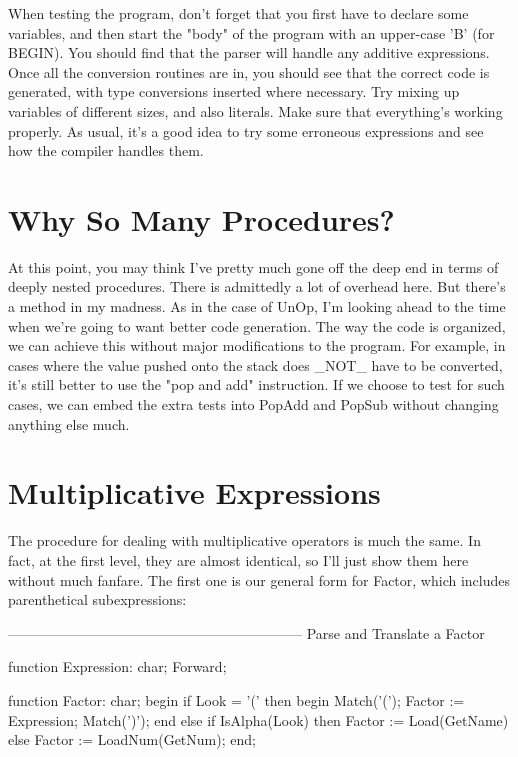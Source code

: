 \documentclass[float=false, crop=false]{standalone}
\begin{document}
When testing the program, don't forget that you first have to declare some
variables, and then start the "body" of the program with an upper-case 'B' (for
BEGIN). You should find that the parser will handle any additive expressions.
Once all the conversion routines are in, you should see that the correct code is
generated, with type conversions inserted where necessary. Try mixing up
variables of different sizes, and also literals. Make sure that everything's
working properly. As usual, it's a good idea to try some erroneous expressions
and see how the compiler handles them.


\section{Why So Many Procedures?}

At this point, you may think I've pretty much gone off the deep end in terms of
deeply nested procedures. There is admittedly a lot of overhead here. But
there's a method in my madness. As in the case of UnOp, I'm looking ahead to the
time when we're going to want better code generation. The way the code is
organized, we can achieve this without major modifications to the program. For
example, in cases where the value pushed onto the stack does _NOT_ have to be
converted, it's still better to use the "pop and add" instruction. If we choose
to test for such cases, we can embed the extra tests into PopAdd and PopSub
without changing anything else much.


\section{Multiplicative Expressions}

The procedure for dealing with multiplicative operators is much the same. In
fact, at the first level, they are almost identical, so I'll just show them here
without much fanfare. The first one is our general form for Factor, which
includes parenthetical subexpressions:


{---------------------------------------------------------------}
{ Parse and Translate a Factor }

function Expression: char; Forward;

function Factor: char;
begin
   if Look = '(' then begin
      Match('(');
      Factor := Expression;
      Match(')');
      end
   else if IsAlpha(Look) then
      Factor := Load(GetName)
   else
      Factor := LoadNum(GetNum);
end;
\end{document}
